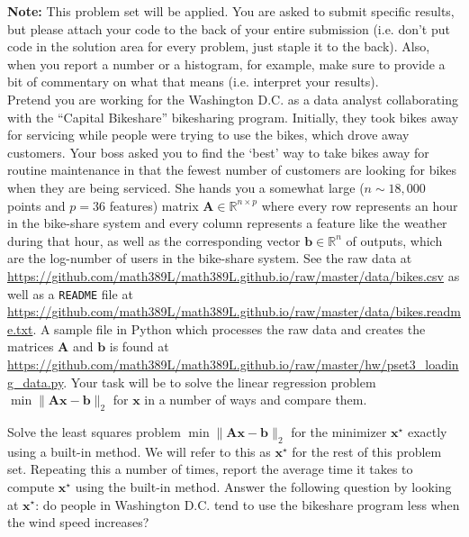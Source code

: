 \documentclass[12pt,letterpaper,cm]{hmcpset}
\newcommand\A{\boldsymbol{A}}
\renewcommand\b{\boldsymbol{b}}
\newcommand\x{\boldsymbol{x}}
\begin{document}
\textbf{Note:} This problem set will be applied. You are asked to submit specific results, but please attach your code to the back of your entire submission (i.e. don't put code in the solution area for every problem, just staple it to the back). Also, when you report a number or a histogram, for example, make sure to provide a bit of commentary on what that means (i.e. interpret your results).\\

Pretend you are working for the Washington D.C. as a data analyst collaborating with the ``Capital Bikeshare'' bikesharing program. Initially, they took bikes away for servicing while people were trying to use the bikes, which drove away customers. Your boss asked you to find the `best' way to take bikes away for routine maintenance in that the fewest number of customers are looking for bikes when they are being serviced. She hands you a somewhat large ($n\sim 18,000$ points and $p=36$ features) matrix $\A\in\mathbb{R}^{n\times p}$ where every row represents an hour in the bike-share system and every column represents a feature like the weather during that hour, as well as the corresponding vector $\b\in\mathbb{R}^n$ of outputs, which are the log-number of users in the bike-share system. See the raw data at \url{https://github.com/math389L/math389L.github.io/raw/master/data/bikes.csv} as well as a \verb+README+ file at \url{https://github.com/math389L/math389L.github.io/raw/master/data/bikes.readme.txt}. A sample file in Python which processes the raw data and creates the matrices $\A$ and $\b$ is found at \url{https://github.com/math389L/math389L.github.io/raw/master/hw/pset3_loading_data.py}. Your task will be to solve the linear regression problem $\min\|\A\x - \b\|_2$ for $\x$ in a number of ways and compare them.

\begin{problem}[1]
    Solve the least squares problem $\min\|\A\x - \b\|_2$ for the minimizer $\x^\star$ exactly using a built-in method. We will refer to this as $\x^\star$ for the rest of this problem set. Repeating this a number of times, report the average time it takes to compute $\x^\star$ using the built-in method. Answer the following question by looking at $\x^\star$: do people in Washington D.C. tend to use the bikeshare program less when the wind speed increases?
\end{problem}

\begin{solution}
\end{solution}
\end{document}
